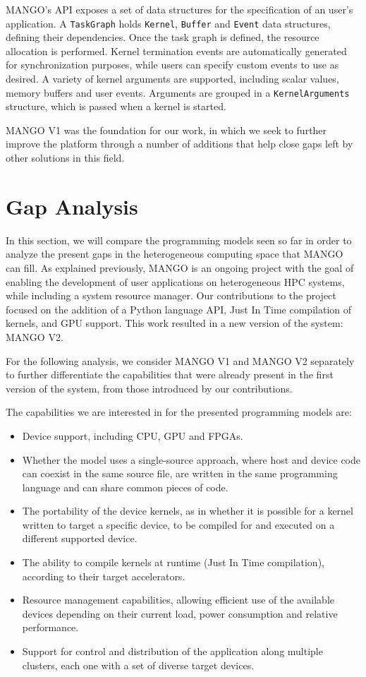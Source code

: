 MANGO's API exposes a set of data structures for the specification of an user's application. A \texttt{TaskGraph} holds \texttt{Kernel}, \texttt{Buffer} and \texttt{Event} data structures, defining their dependencies. 
Once the task graph is defined, the resource allocation is performed.
Kernel termination events are automatically generated for synchronization purposes, while users can specify custom events to use as desired.
A variety of kernel arguments are supported, including scalar values, memory buffers and user events. Arguments are grouped in a \texttt{KernelArguments} structure, which is passed when a kernel is started.

MANGO V1 was the foundation for our work, in which we seek to further improve the platform through a number of additions that help close gaps left by other solutions in this field.

\section{Gap Analysis}

In this section, we will compare the programming models seen so far in order to analyze the present gaps in the heterogeneous computing space that MANGO can fill.
As explained previously, MANGO is an ongoing project with the goal of enabling the development of user applications on heterogeneous HPC systems, while including a system resource manager. 
Our contributions to the project focused on the addition of a Python language API, Just In Time compilation of kernels, and GPU support.
This work resulted in a new version of the system: MANGO V2.

For the following analysis, we consider MANGO V1 and MANGO V2 separately to further differentiate the capabilities that were already present in the first version of the system, from those introduced by our contributions.

The capabilities we are interested in for the presented programming models are:

\begin{itemize}
    \item Device support, including CPU, GPU and FPGAs.
    \item Whether the model uses a single-source approach, where host and device code can coexist in the same source file, are written in the same programming language and can share common pieces of code.
    \item The portability of the device kernels, as in whether it is possible for a kernel written to target a specific device, to be compiled for and executed on a different supported device.
    \item The ability to compile kernels at runtime (Just In Time compilation), according to their target accelerators.
    \item Resource management capabilities, allowing efficient use of the available devices depending on their current load, power consumption and relative performance.
    \item Support for control and distribution of the application along multiple clusters, each one with a set of diverse target devices.
\end{itemize}

